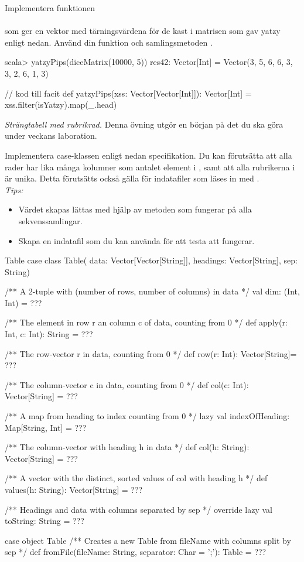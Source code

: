 \Subtask Implementera funktionen \\ 
 \\ som ger en vektor med tärningsvärdena för de kast i matrisen  som gav yatzy enligt nedan. Använd din funktion  och samlingsmetoden . 
\begin{REPL}
scala> yatzyPips(diceMatrix(10000, 5))
res42: Vector[Int] = Vector(3, 5, 6, 6, 3, 3, 2, 6, 1, 3)
\end{REPL}

\begin{Code}
// kod till facit
def yatzyPips(xss: Vector[Vector[Int]]): Vector[Int] = 
  xss.filter(isYatzy).map(_.head)
\end{Code}



\Task \emph{Strängtabell med rubrikrad.} Denna övning utgör en början på det du ska göra under veckans laboration.

\Subtask Implementera case-klassen  enligt nedan specifikation. Du kan förutsätta att alla rader har lika många kolumner som antalet element i , samt att alla rubrikerna i  är unika. Detta förutsätts också gälla för indatafiler som läses in med . 
\\ \noindent \emph{Tips:} 
\begin{itemize}[nolistsep,noitemsep]
\item Värdet  skapas lättas med hjälp av metoden  som fungerar på alla sekvenssamlingar.
\item Skapa en indatafil som du kan använda för att testa att  fungerar. 
\end{itemize}

\begin{ScalaSpec}{Table}
case class Table(
  data: Vector[Vector[String]], 
  headings: Vector[String], 
  sep: String){
  /** A 2-tuple with (number of rows, number of columns) in data */
  val dim: (Int, Int) = ???

  /** The element in row r an column c of data, counting from 0 */
  def apply(r: Int, c: Int): String = ???

  /** The row-vector r in data, counting from 0 */
  def row(r: Int): Vector[String]= ???

  /** The column-vector c in data, counting from 0 */
  def col(c: Int): Vector[String] = ???

  /** A map from heading to index counting from 0 */
  lazy val indexOfHeading: Map[String, Int] = ???

  /** The column-vector with heading h in data */
  def col(h: String): Vector[String] = ???

  /** A vector with the distinct, sorted values of col with heading h */ 
  def values(h: String): Vector[String] = ???

  /** Headings and data with columns separated by sep */
  override lazy val toString: String = ???
}
case object Table {
  /** Creates a new Table from fileName with columns split by sep */
  def fromFile(fileName: String, separator: Char = ';'): Table = ???
}
\end{ScalaSpec}


